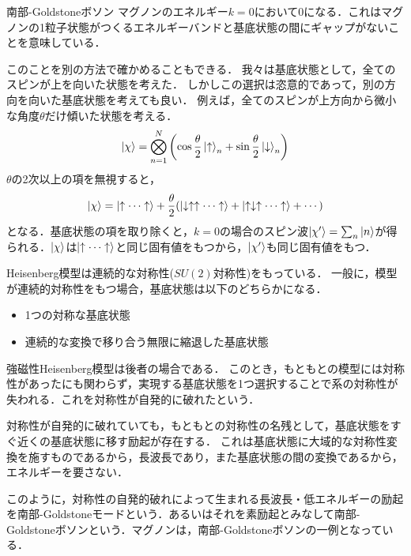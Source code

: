 \documentclass[dvipdfmx,9pt]{beamer}
\numberwithin{equation}{section}
\begin{document}
\begin{frame}{南部-Goldstoneボソン}
    マグノンのエネルギー$k=0$において$0$になる．これはマグノンの1粒子状態がつくるエネルギーバンドと基底状態の間に\alert{ギャップがない}ことを意味している．

    このことを別の方法で確かめることもできる．
    我々は基底状態として，全てのスピンが上を向いた状態を考えた．
    しかしこの選択は恣意的であって，別の方向を向いた基底状態を考えても良い．
    例えば，全てのスピンが上方向から微小な角度$\theta$だけ傾いた状態を考える．
    \begin{align}
        \ket{\chi} = \bigotimes_{n=1}^N \qty(\cos\frac{\theta}{2}\ket{\uparrow}_n + \sin \frac{\theta}{2}\ket{\downarrow}_n)
    \end{align}
    $\theta$の2次以上の項を無視すると，
    \begin{align}
        \ket{\chi} = \ket{\uparrow\cdots\uparrow} + \frac{\theta}{2}\qty(\ket{\downarrow\uparrow\uparrow\cdots\uparrow}+ \ket{\uparrow\downarrow\uparrow\cdots\uparrow}+\cdots)
    \end{align}
    となる．基底状態の項を取り除くと，$k=0$の場合のスピン波$\ket{\chi'} = \sum_n \ket{n}$が得られる．$\ket{\chi}$は$\ket{\uparrow\cdots\uparrow}$と同じ固有値をもつから，$\ket{\chi'}$も同じ固有値をもつ．
\end{frame}

\begin{frame}
    Heisenberg模型は連続的な対称性($SU(2)$対称性)をもっている．
    一般に，模型が連続的対称性をもつ場合，基底状態は以下のどちらかになる．
    \begin{itemize}
        \item 1つの対称な基底状態
        \item 連続的な変換で移り合う無限に縮退した基底状態
    \end{itemize}
    強磁性Heisenberg模型は後者の場合である．
    このとき，もともとの模型には対称性があったにも関わらず，実現する基底状態を1つ選択することで系の対称性が失われる．これを\alert{対称性が自発的に破れた}という．

    対称性が自発的に破れていても，もともとの対称性の名残として，基底状態をすぐ近くの基底状態に移す励起が存在する．
    これは基底状態に大域的な対称性変換を施すものであるから，長波長であり，また基底状態の間の変換であるから，エネルギーを要さない．

    このように，対称性の自発的破れによって生まれる長波長・低エネルギーの励起を南部-Goldstoneモードという．あるいはそれを素励起とみなして南部-Goldstoneボソンという．マグノンは，南部-Goldstoneボソンの一例となっている．
\end{frame}
\end{document}
